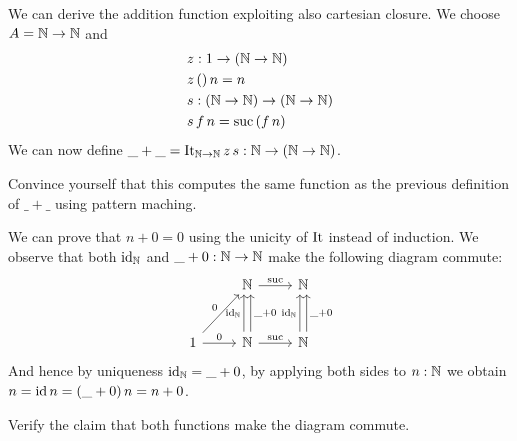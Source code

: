 We can derive the addition function exploiting also cartesian closure. We choose $A = \mathbb{N} \to \mathbb{N}$ and
\begin{align*}
& z : 1 \to (\mathbb{N} \to \mathbb{N}) \\
& z\,()\,n = n \\
& s : (\mathbb{N} \to \mathbb{N}) \to (\mathbb{N} \to \mathbb{N}) \\
& s\,f\,n = \mathrm{suc}\,(f\,n)
\end{align*}
We can now define $\_+\_ = \mathrm{It}_{\mathbb{N}\to\mathbb{N}}\,z\,s : \mathbb{N} \to (\mathbb{N} \to \mathbb{N})$.
\begin{Exercise}
  Convince yourself that this computes the same function as the previous definition of $\_+\_$ using pattern maching.
\end{Exercise}

We can prove that $n + 0 = 0$ using the unicity of $\mathrm{It}$ instead of induction. We observe that both $\mathrm{id}_{\mathbb{N}}$ and $\_+0 : \mathbb{N} \to \mathbb{N}$ make the following diagram commute:
\[\begin{tikzcd}[row sep = large]
& \Nat \arrow[r,"\suc"] & \Nat \\
1 \arrow[ur,"0"] \arrow[r,"0"] & \Nat \arrow[r,"\suc"] \arrow[u, shift left,"\id_\Nat" left] 
\arrow[u,shift right, "\_+0" right]
& \Nat  \arrow[u,shift left,"\id_\Nat" left]\arrow[u,shift right,"\_+0" right]
\end{tikzcd}\]  
And hence by uniqueness $\mathrm{id}_{\mathbb{N}} = \_+0$, by applying both sides to $n:\mathbb{N}$ we obtain 
$n = \mathrm{id}\,n = (\_ + 0)\,n = n + 0$. 
\begin{Exercise}
  Verify the claim that both functions make the diagram commute.
\end{Exercise}

